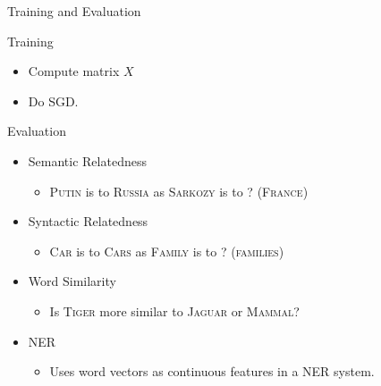 \begin{frame}{Training and Evaluation}

  \begin{exampleblock}{Training}
    \begin{itemize}[<+->]
    \item Compute matrix $X$
    \item Do SGD.
    \end{itemize}
  \end{exampleblock}
  
  \begin{alertblock}{Evaluation}
    \begin{itemize}[<+->]
    \item Semantic Relatedness %
      \begin{itemize}
      \item \textsc{Putin} is to \textsc{Russia} as \textsc{Sarkozy} is to ? (\textsc{France})
      \end{itemize}
    \item Syntactic Relatedness %
      \begin{itemize}
      \item \textsc{Car} is to \textsc{Cars} as \textsc{Family} is to ? (\textsc{families})
      \end{itemize}
    \item Word Similarity
      \begin{itemize}
      \item Is \textsc{Tiger} more similar to \textsc{Jaguar} or \textsc{Mammal}?
        \end{itemize}
    \item NER 
      \begin{itemize}
      \item Uses word vectors as continuous features in a NER system.
      \end{itemize}
    \end{itemize}
  \end{alertblock}
\end{frame}

